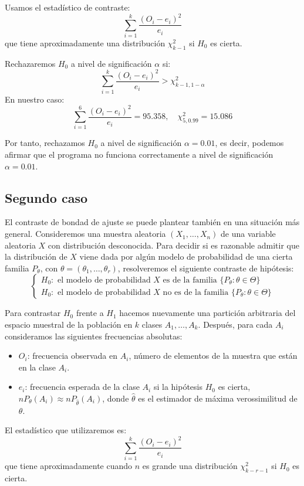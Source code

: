 \begin{example}
    Usamos el estadístico de contraste:
    $$\sum_{i=1}^k \frac{(O_i-e_i)^2}{e_i}$$
    que tiene aproximadamente una distribución $\chi^2_{k-1}$ si $H_0$ es cierta.

    Rechazaremos $H_0$ a nivel de significación $\alpha$ si:
    $$\sum_{i=1}^k \frac{(O_i-e_i)^2}{e_i} > \chi^2_{k-1, 1-\alpha}$$
    En nuestro caso:
    $$\sum_{i=1}^6 \frac{(O_i-e_i)^2}{e_i} = 95.358, \quad \chi^2_{5, 0.99} = 15.086$$

    Por tanto, rechazamos $H_0$ a nivel de significación $\alpha = 0.01$, es decir, podemos afirmar que el programa no funciona correctamente a nivel de significación $\alpha = 0.01$.
\end{example}

\subsection*{Segundo caso}
El contraste de bondad de ajuste se puede plantear también en una situación más general.
Consideremos una muestra aleatoria $(X_1, \dots, X_n)$ de una variable aleatoria $X$ con distribución desconocida.
Para decidir si es razonable admitir que la distribución de $X$ viene dada por algún modelo de probabilidad de una cierta familia $P_\theta$, con $\theta = (\theta_1, \dots, \theta_r)$, resolveremos el siguiente contraste de hipótesis:
$$\begin{cases}
        H_0: \text{ el modelo de probabilidad } X \text{ es de la familia } \{P_\theta: \theta \in \Theta\} \\
        H_0: \text{ el modelo de probabilidad } X \text{ no es de la familia } \{P_\theta: \theta \in \Theta\}
    \end{cases}$$

Para contrastar $H_0$ frente a $H_1$ hacemos nuevamente una partición arbitraria del espacio muestral de la población en $k$ clases $A_1, \dots, A_k$.
Después, para cada $A_i$ consideramos las siguientes frecuencias absolutas:
\begin{itemize}
    \item $O_i$: frecuencia observada en $A_i$, número de elementos de la muestra que están en la clase $A_i$.
    \item $e_i$: frecuencia esperada de la clase $A_i$ si la hipótesis $H_0$ es cierta, $nP_\theta(A_i) \approx nP_{\hat{\theta}}(A_i)$, donde $\hat{\theta}$ es el estimador de máxima verossimilitud de $\theta$.
\end{itemize}

El estadístico que utilizaremos es:
$$\sum_{i=1}^k \frac{(O_i-e_i)^2}{e_i}$$
que tiene aproximadamente cuando $n$ es grande una distribución $\chi^2_{k-r-1}$ si $H_0$ es cierta.

